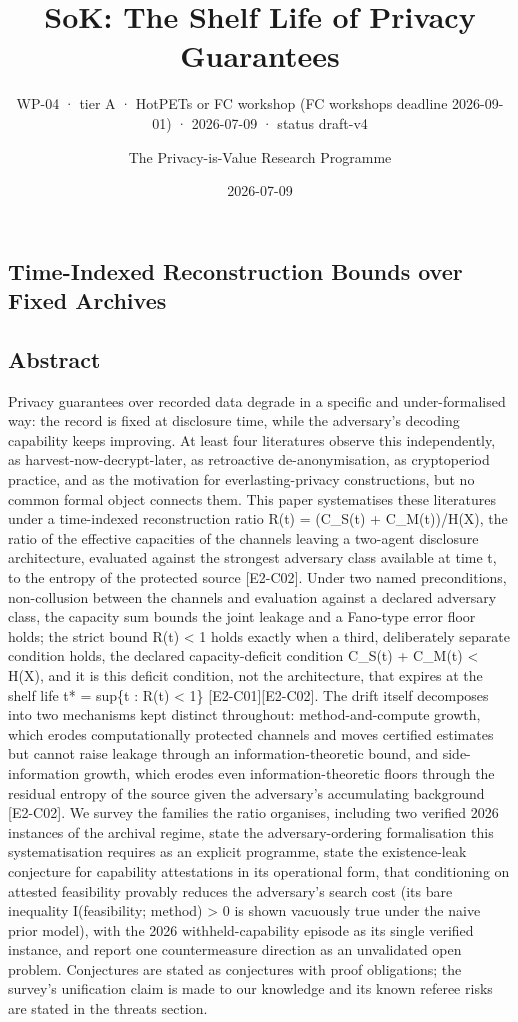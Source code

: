 \documentclass[
  11pt,
]{article}
\title{SoK: The Shelf Life of Privacy Guarantees}
\subtitle{WP-04 · tier A · HotPETs or FC workshop (FC workshops deadline
2026-09-01) · 2026-07-09 · status draft-v4}
\author{The Privacy-is-Value Research Programme}
\date{2026-07-09}
\begin{document}
\maketitle

\subsection{Time-Indexed Reconstruction Bounds over Fixed
Archives}\label{time-indexed-reconstruction-bounds-over-fixed-archives}

\subsection{Abstract}\label{abstract}

Privacy guarantees over recorded data degrade in a specific and
under-formalised way: the record is fixed at disclosure time, while the
adversary's decoding capability keeps improving. At least four
literatures observe this independently, as harvest-now-decrypt-later, as
retroactive de-anonymisation, as cryptoperiod practice, and as the
motivation for everlasting-privacy constructions, but no common formal
object connects them. This paper systematises these literatures under a
time-indexed reconstruction ratio R(t) = (C\_S(t) + C\_M(t))/H(X), the
ratio of the effective capacities of the channels leaving a two-agent
disclosure architecture, evaluated against the strongest adversary class
available at time t, to the entropy of the protected source
{[}E2-C02{]}. Under two named preconditions, non-collusion between the
channels and evaluation against a declared adversary class, the capacity
sum bounds the joint leakage and a Fano-type error floor holds; the
strict bound R(t) \textless{} 1 holds exactly when a third, deliberately
separate condition holds, the declared capacity-deficit condition
C\_S(t) + C\_M(t) \textless{} H(X), and it is this deficit condition,
not the architecture, that expires at the shelf life t* = sup\{t : R(t)
\textless{} 1\} {[}E2-C01{]}{[}E2-C02{]}. The drift itself decomposes
into two mechanisms kept distinct throughout: method-and-compute growth,
which erodes computationally protected channels and moves certified
estimates but cannot raise leakage through an information-theoretic
bound, and side-information growth, which erodes even
information-theoretic floors through the residual entropy of the source
given the adversary's accumulating background {[}E2-C02{]}. We survey
the families the ratio organises, including two verified 2026 instances
of the archival regime, state the adversary-ordering formalisation this
systematisation requires as an explicit programme, state the
existence-leak conjecture for capability attestations in its operational
form, that conditioning on attested feasibility provably reduces the
adversary's search cost (its bare inequality I(feasibility; method)
\textgreater{} 0 is shown vacuously true under the naive prior model),
with the 2026 withheld-capability episode as its single verified
instance, and report one countermeasure direction as an unvalidated open
problem. Conjectures are stated as conjectures with proof obligations;
the survey's unification claim is made to our knowledge and its known
referee risks are stated in the threats section.
\end{document}
